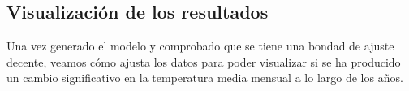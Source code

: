 \documentclass[12pt,a4paper,]{book}
\newenvironment{Shaded}{\begin{snugshade}}{\end{snugshade}}
\newcommand{\AttributeTok}[1]{\textcolor[rgb]{0.13,0.29,0.53}{#1}}
\newcommand{\DecValTok}[1]{\textcolor[rgb]{0.00,0.00,0.81}{#1}}
\newcommand{\FunctionTok}[1]{\textcolor[rgb]{0.13,0.29,0.53}{\textbf{#1}}}
\newcommand{\NormalTok}[1]{#1}
\newcommand{\OtherTok}[1]{\textcolor[rgb]{0.56,0.35,0.01}{#1}}
\newcommand{\SpecialCharTok}[1]{\textcolor[rgb]{0.81,0.36,0.00}{\textbf{#1}}}
\numberwithin{dummy}{section}
\theoremstyle{ocrenumbox}
\theoremstyle{blacknumex}
\theoremstyle{blacknumbox}
\theoremstyle{ocrenum}
\theoremstyle{ocrenum}
\begin{document}
\hypertarget{visualizaciuxf3n-de-los-resultados}{%
\subsection{Visualización de los
resultados}\label{visualizaciuxf3n-de-los-resultados}}

Una vez generado el modelo y comprobado que se tiene una bondad de
ajuste decente, veamos cómo ajusta los datos para poder visualizar si se
ha producido un cambio significativo en la temperatura media mensual a
lo largo de los años.

\begin{Shaded}
\end{Shaded}
\end{document}
